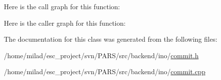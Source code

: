 Here is the call graph for this function:




Here is the caller graph for this function:




The documentation for this class was generated from the following files:\begin{DoxyCompactItemize}
\item 
/home/milad/esc\_\-project/svn/PARS/src/backend/ino/\hyperlink{ino_2commit_8h}{commit.h}\item 
/home/milad/esc\_\-project/svn/PARS/src/backend/ino/\hyperlink{ino_2commit_8cpp}{commit.cpp}\end{DoxyCompactItemize}
